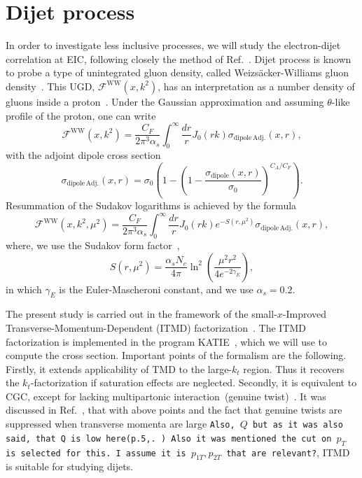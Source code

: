 \documentclass[a4,12pt]{article}
\newcommand{\fww}[0]{\mathcal{F}^{\mathrm{WW}}}
\newcommand{\sdp}[0]{\sigma_{\mathrm{dipole}}}
\newcommand{\sdpa}[0]{\sigma_{\mathrm{dipole\,Adj.}}}
\newcommand{\comment}[1]{\texttt{\color{red}#1}}
\begin{document}
\section{Dijet process}
In order to investigate less inclusive processes, we will study the electron-dijet correlation at EIC, following closely the method of Ref.~\cite{vanHameren:2021sqc}. 
Dijet process is known to probe a type of unintegrated gluon density, called Weizs\"acker-Williams gluon density~\cite{Dominguez:2010xd,Dominguez:2011wm,Xiao:2017ggh}.
This UGD, $\fww(x,k^2)$, has an interpretation as a number density of gluons inside a proton~\cite{Dominguez:2010xd,Dominguez:2011wm}. Under the Gaussian approximation and assuming $\theta$-like profile of the proton, one can write~\cite{vanHameren:2016ftb,Xiao:2017ggh,Dominguez:2010xd,Dominguez:2011wm}
\begin{equation}
\fww(x,k^2)= \frac{C_F}{2\pi^3\alpha_s}\int^\infty_0\frac{dr}{r}J_0(r k) \sdpa(x,r),
\end{equation} 	
with the adjoint dipole cross section
\begin{equation}
\sdpa(x,r)=\sigma_0\left( 1-\left(1-\frac{\sdp(x,r)}{\sigma_0}\right)^{C_A/C_F}\right).
\label{eq:ww}
\end{equation}
Resummation of the Sudakov logarithms is achieved by the formula~\cite{Xiao:2017yya}
\begin{equation}
	\fww(x,k^2,\mu^2)= \frac{C_F}{2\pi^3\alpha_s}\int^\infty_0\frac{dr}{r}J_0(r k) e^{-S(r,\mu^2)} \sdpa(x,r),
	\label{eq:ww-sud}
\end{equation}
where, we use the Sudakov form factor~\cite{Mueller:2013wwa,Xiao:2017yya},
\begin{equation}
	S(r,\mu^2)=\frac{\alpha_s N_c}{4\pi}\ln^2\left(\frac{\mu^2r^2}{4e^{-2\gamma_E}}\right),
\end{equation}
in which $\gamma_E$ is the Euler-Mascheroni constant, and we use $\alpha_s=0.2$. 
 

  
The present study is carried out in the framework of the small-$x$-Improved Transverse-Momentum-Dependent (ITMD) factorization~\cite{Kotko:2015ura,vanHameren:2016ftb}.
The ITMD factorization is implemented in the program KATIE~\cite{vanHameren:2016kkz}, which we will use to compute the cross section. Important points of the formalism are the following. Firstly, it extends applicability of TMD to the large-$k_t$ region. Thus it recovers the $k_t$-factorization if saturation effects are neglected. Secondly, it is equivalent to CGC, except for lacking multipartonic interaction~(genuine twist)~\cite{Altinoluk:2019fui}. It was discussed in Ref.~\cite{vanHameren:2021sqc}, that with above points and the fact that genuine twists are suppressed when transverse momenta are large \comment{Also, $Q$ but as it was also said, that Q is low here(p.5,\cite{vanHameren:2021sqc}. )  Also it was mentioned the cut on $p_T$ is selected for this. I assume it is $p_{1T}, p_{2T}$ that are relevant?}, ITMD is suitable for studying dijets.
\end{document}
